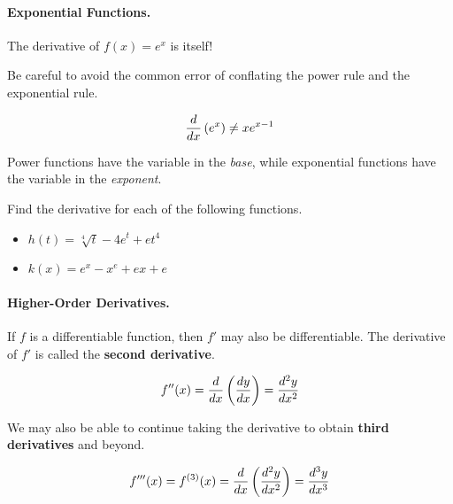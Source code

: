 \documentclass[12pt]{article}
\begin{document}
        \newpage
        
\paragraph{Exponential Functions.} The derivative of $f(x)=e^x$ is itself!

\vspace{20mm}


\vspace{5mm}

Be careful to avoid the common error of conflating the power rule and the exponential rule.

$$\frac{d}{dx}\left( e^x \right)\neq xe^{x-1}$$

\vspace{3mm}

Power functions have the variable in the \textit{base}, while exponential functions have the variable in the \textit{exponent}. 

\Example Find the derivative for each of the following functions.
\begin{itemize}
	\item[\tc{1}] $h(t)=\sqrt[4]{t}-4e^t+et^4$
	
	\vspace{20mm}
	
	\item[\tc{2}] $k(x)=e^x-x^e+ex+e$
	
	\vspace{20mm}
	
\end{itemize}

\paragraph{Higher-Order Derivatives.} If $f$ is a differentiable function, then $f'$ may also be differentiable. The derivative of $f'$ is called the \textbf{second derivative}.

$$f''(x)=\frac{d}{dx}\left(\frac{dy}{dx}\right)=\frac{d^2y}{dx^2}$$

\vspace{3mm}

We may also be able to continue taking the derivative to obtain \textbf{third derivatives} and beyond.

$$f'''(x)=f^{(3)}(x)=\frac{d}{dx}\left(\frac{d^2y}{dx^2}\right)=\frac{d^3y}{dx^3}$$
\end{document}
